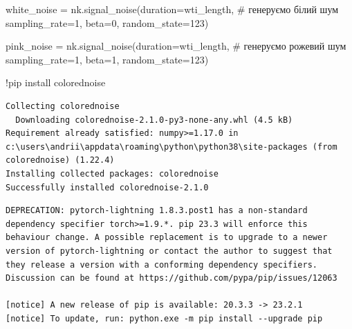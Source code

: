 \documentclass[
  letterpaper,
]{report}
\newenvironment{Shaded}{\begin{snugshade}}{\end{snugshade}}
\newcommand{\CommentTok}[1]{\textcolor[rgb]{0.37,0.37,0.37}{#1}}
\newcommand{\DecValTok}[1]{\textcolor[rgb]{0.68,0.00,0.00}{#1}}
\newcommand{\NormalTok}[1]{\textcolor[rgb]{0.00,0.23,0.31}{#1}}
\newcommand{\OperatorTok}[1]{\textcolor[rgb]{0.37,0.37,0.37}{#1}}
\begin{document}
\begin{Shaded}
\begin{Highlighting}[]
\NormalTok{white\_noise }\OperatorTok{=}\NormalTok{ nk.signal\_noise(duration}\OperatorTok{=}\NormalTok{wti\_length, }\CommentTok{\# генеруємо білий шум }
\NormalTok{                              sampling\_rate}\OperatorTok{=}\DecValTok{1}\NormalTok{, }
\NormalTok{                              beta}\OperatorTok{=}\DecValTok{0}\NormalTok{, }
\NormalTok{                              random\_state}\OperatorTok{=}\DecValTok{123}\NormalTok{)}

\NormalTok{pink\_noise }\OperatorTok{=}\NormalTok{ nk.signal\_noise(duration}\OperatorTok{=}\NormalTok{wti\_length,  }\CommentTok{\# генеруємо рожевий шум }
\NormalTok{                              sampling\_rate}\OperatorTok{=}\DecValTok{1}\NormalTok{, }
\NormalTok{                              beta}\OperatorTok{=}\DecValTok{1}\NormalTok{, }
\NormalTok{                              random\_state}\OperatorTok{=}\DecValTok{123}\NormalTok{)}
\end{Highlighting}
\end{Shaded}

\begin{Shaded}
\begin{Highlighting}[]
\OperatorTok{!}\NormalTok{pip install colorednoise}
\end{Highlighting}
\end{Shaded}

\begin{verbatim}
Collecting colorednoise
  Downloading colorednoise-2.1.0-py3-none-any.whl (4.5 kB)
Requirement already satisfied: numpy>=1.17.0 in c:\users\andrii\appdata\roaming\python\python38\site-packages (from colorednoise) (1.22.4)
Installing collected packages: colorednoise
Successfully installed colorednoise-2.1.0
\end{verbatim}

\begin{verbatim}
DEPRECATION: pytorch-lightning 1.8.3.post1 has a non-standard dependency specifier torch>=1.9.*. pip 23.3 will enforce this behaviour change. A possible replacement is to upgrade to a newer version of pytorch-lightning or contact the author to suggest that they release a version with a conforming dependency specifiers. Discussion can be found at https://github.com/pypa/pip/issues/12063

[notice] A new release of pip is available: 20.3.3 -> 23.2.1
[notice] To update, run: python.exe -m pip install --upgrade pip
\end{verbatim}
\end{document}
